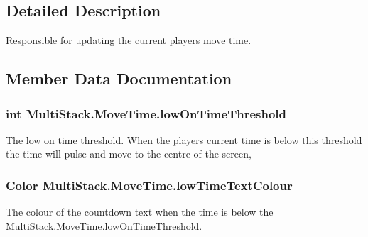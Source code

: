 \subsection{Detailed Description}
Responsible for updating the current players move time. 



\subsection{Member Data Documentation}
\hypertarget{class_multi_stack_1_1_move_time_a1f9dcd4f0bb8bd038f486c5a0ac2478e}{}
\subsubsection[{low\+On\+Time\+Threshold}]{\setlength{\rightskip}{0pt plus 5cm}int Multi\+Stack.\+Move\+Time.\+low\+On\+Time\+Threshold}\label{class_multi_stack_1_1_move_time_a1f9dcd4f0bb8bd038f486c5a0ac2478e}


The low on time threshold. When the players current time is below this threshold the time will pulse and move to the centre of the screen, 

\hypertarget{class_multi_stack_1_1_move_time_a4de86ca47dc6be9e38117ee65a1677e6}{}
\subsubsection[{low\+Time\+Text\+Colour}]{\setlength{\rightskip}{0pt plus 5cm}Color Multi\+Stack.\+Move\+Time.\+low\+Time\+Text\+Colour}\label{class_multi_stack_1_1_move_time_a4de86ca47dc6be9e38117ee65a1677e6}


The colour of the countdown text when the time is below the \hyperlink{class_multi_stack_1_1_move_time_a1f9dcd4f0bb8bd038f486c5a0ac2478e}{Multi\+Stack.\+Move\+Time.\+low\+On\+Time\+Threshold}. 

\hypertarget{class_multi_stack_1_1_move_time_a31e3512da14ba52898e306c4d8b63320}{}
